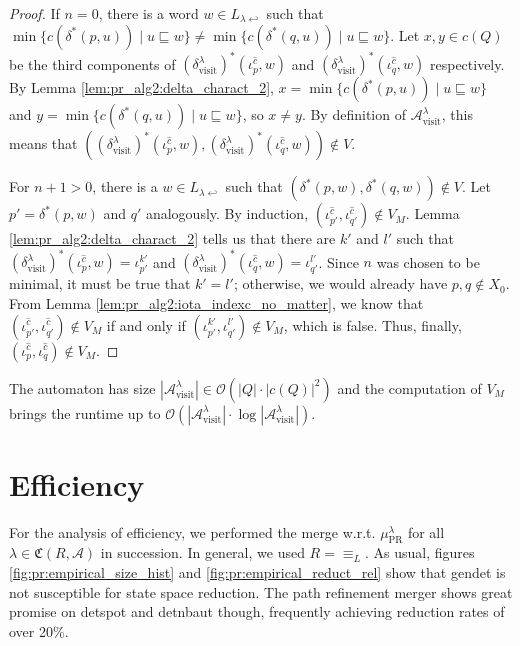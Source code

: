 \begin{proof}
	If $n = 0$, there is a word $w \in L_{\lambda \hookleftarrow}$ such that $\min \{c(\delta^*(p, u)) \mid u \sqsubseteq w\} \neq \min \{c(\delta^*(q, u)) \mid u \sqsubseteq w\}$. Let $x, y \in c(Q)$ be the third components of $(\delta^\lambda_\text{visit})^*(\iota_p^{\hat{c}}, w)$ and $(\delta^\lambda_\text{visit})^*(\iota_q^{\hat{c}}, w)$ respectively. By Lemma \ref{lem:pr_alg2:delta_charact_2}, $x = \min \{c(\delta^*(p, u)) \mid u \sqsubseteq w\}$ and $y = \min \{c(\delta^*(q, u)) \mid u \sqsubseteq w\}$, so $x \neq y$. By definition of $\mathcal{A}^\lambda_\text{visit}$, this means that $((\delta^\lambda_\text{visit})^*(\iota_p^{\hat{c}}, w), (\delta^\lambda_\text{visit})^*(\iota_q^{\hat{c}}, w)) \notin V$.
	
	For $n+1 > 0$, there is a $w \in L_{\lambda \hookleftarrow}$ such that $(\delta^*(p, w), \delta^*(q, w)) \notin V$. Let $p' = \delta^*(p, w)$ and $q'$ analogously. By induction, $(\iota_{p'}^{\hat{c}}, \iota_{q'}^{\hat{c}}) \notin V_M$. Lemma \ref{lem:pr_alg2:delta_charact_2} tells us that there are $k'$ and $l'$ such that $(\delta^\lambda_\text{visit})^*(\iota_p^{\hat{c}}, w) = \iota_{p'}^{k'}$ and $(\delta^\lambda_\text{visit})^*(\iota_q^{\hat{c}}, w) = \iota_{q'}^{l'}$. Since $n$ was chosen to be minimal, it must be true that $k' = l'$; otherwise, we would already have $p, q \notin X_0$. From Lemma \ref{lem:pr_alg2:iota_indexc_no_matter}, we know that $(\iota_{p'}^{\hat{c}}, \iota_{q'}^{\hat{c}}) \notin V_M$ if and only if $(\iota_{p'}^{k'}, \iota_{q'}^{l'}) \notin V_M$, which is false. Thus, finally, $(\iota_p^{\hat{c}}, \iota_q^{\hat{c}}) \notin V_M$.
\end{proof}

The automaton has size $|\mathcal{A}^\lambda_\text{visit}| \in \mathcal{O}(|Q| \cdot |c(Q)|^2)$ and the computation of $V_M$ brings the runtime up to $\mathcal{O}(|\mathcal{A}^\lambda_\text{visit}| \cdot \log |\mathcal{A}^\lambda_\text{visit}|)$.



\section{Efficiency}
For the analysis of efficiency, we performed the merge w.r.t. $\mu_\text{PR}^\lambda$ for all $\lambda \in \mathfrak{C}(R, \mathcal{A})$ in succession. In general, we used $R = \equiv_L$. As usual, figures \ref{fig:pr:empirical_size_hist} and \ref{fig:pr:empirical_reduct_rel} show that \textsf{gendet} is not susceptible for state space reduction. The path refinement merger shows great promise on \textsf{detspot} and \textsf{detnbaut} though, frequently achieving reduction rates of over 20\%. 

